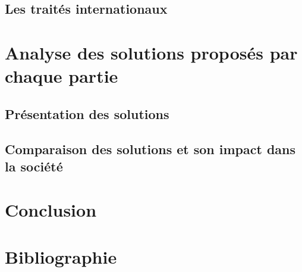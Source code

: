 \documentclass[a4paper,11pt]{article}
\begin{document}
\subsection{Les traités internationaux}


\section{Analyse des solutions proposés par chaque partie}
\subsection{Présentation des solutions}
\subsection{Comparaison des solutions et son impact dans la société}


\section*{Conclusion}
\section*{Bibliographie}
\end{document}
